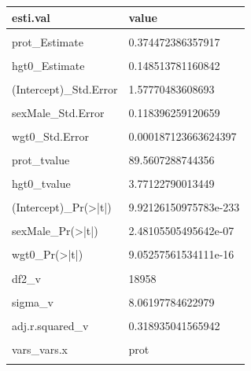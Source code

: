 \documentclass[
]{book}
\begin{document}
\begin{table}[!h]
\centering
\begin{tabular}{l|l}
\hline
esti.val & value\\
\hline
\cellcolor{gray!6}{(Intercept)\_Estimate} & \cellcolor{gray!6}{52.1186286658651}\\
\hline
prot\_Estimate & 0.374472386357917\\
\hline
\cellcolor{gray!6}{sexMale\_Estimate} & \cellcolor{gray!6}{0.611043720578292}\\
\hline
hgt0\_Estimate & 0.148513781160842\\
\hline
\cellcolor{gray!6}{wgt0\_Estimate} & \cellcolor{gray!6}{0.00150560230505631}\\
\hline
(Intercept)\_Std.Error & 1.57770483608693\\
\hline
\cellcolor{gray!6}{prot\_Std.Error} & \cellcolor{gray!6}{0.00418121191133815}\\
\hline
sexMale\_Std.Error & 0.118396259120659\\
\hline
\cellcolor{gray!6}{hgt0\_Std.Error} & \cellcolor{gray!6}{0.0393807494783186}\\
\hline
wgt0\_Std.Error & 0.000187123663624397\\
\hline
\cellcolor{gray!6}{(Intercept)\_tvalue} & \cellcolor{gray!6}{33.0344608660332}\\
\hline
prot\_tvalue & 89.5607288744356\\
\hline
\cellcolor{gray!6}{sexMale\_tvalue} & \cellcolor{gray!6}{5.16100529794248}\\
\hline
hgt0\_tvalue & 3.77122790013449\\
\hline
\cellcolor{gray!6}{wgt0\_tvalue} & \cellcolor{gray!6}{8.04602836377991}\\
\hline
(Intercept)\_Pr(>|t|) & 9.92126150975783e-233\\
\hline
\cellcolor{gray!6}{prot\_Pr(>|t|)} & \cellcolor{gray!6}{0}\\
\hline
sexMale\_Pr(>|t|) & 2.48105505495642e-07\\
\hline
\cellcolor{gray!6}{hgt0\_Pr(>|t|)} & \cellcolor{gray!6}{0.000162939618371183}\\
\hline
wgt0\_Pr(>|t|) & 9.05257561534111e-16\\
\hline
\cellcolor{gray!6}{df1\_v} & \cellcolor{gray!6}{5}\\
\hline
df2\_v & 18958\\
\hline
\cellcolor{gray!6}{df3\_v} & \cellcolor{gray!6}{5}\\
\hline
sigma\_v & 8.06197784622979\\
\hline
\cellcolor{gray!6}{r.squared\_v} & \cellcolor{gray!6}{0.319078711001325}\\
\hline
adj.r.squared\_v & 0.318935041565942\\
\hline
\cellcolor{gray!6}{vars\_var.y} & \cellcolor{gray!6}{hgt}\\
\hline
vars\_vars.x & prot\\
\hline
\cellcolor{gray!6}{vars\_vars.c} & \cellcolor{gray!6}{sex+hgt0+wgt0}\\
\hline
\end{tabular}
\end{table}
\end{document}
